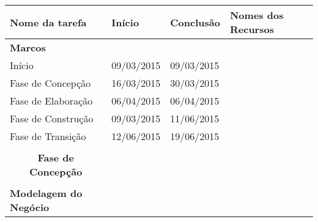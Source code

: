 \begin{table}[h]
\begin{tabular}{llll}
\hline
\textbf{Nome da tarefa}                         & \textbf{Início} & \textbf{Conclusão} & \textbf{Nomes dos Recursos}                                                                             \\ \hline
\textbf{Marcos}                                 &                 &                    &                                                                                                         \\
Início                                          & 09/03/2015      & 09/03/2015         &                                                                                                         \\
Fase de Concepção                               & 16/03/2015      & 30/03/2015         &                                                                                                         \\
Fase de Elaboração                              & 06/04/2015      & 06/04/2015         &                                                                                                         \\
Fase de Construção                              & 09/03/2015      & 11/06/2015         &                                                                                                         \\
Fase de Transição                               & 12/06/2015      & 19/06/2015         &                                                                                                         \\
                                                &                 &                    &                                                                                                         \\
\multicolumn{1}{c}{\textbf{Fase de Concepção}}  &                 &                    &                                                                                                         \\
                                                &                 &                    &                                                                                                         \\
\textbf{Modelagem do Negócio}                   &                 &                    &                                                                                                         \\

\end{tabular}
\end{table}
